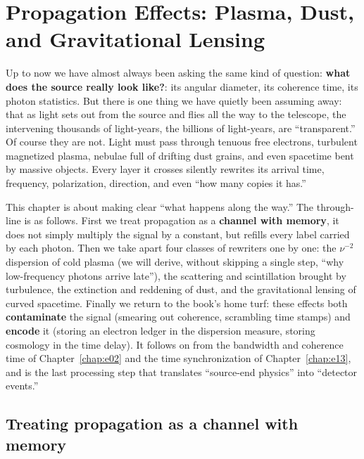 \chapter{Propagation Effects: Plasma, Dust, and Gravitational Lensing}
\label{chap:e21}

\begin{chapteropening}
Up to now we have almost always been asking the same kind of question: \textbf{what does the source really look like?}: its angular diameter, its coherence time, its photon statistics. But there is one thing we have quietly been assuming away: that as light sets out from the source and flies all the way to the telescope, the intervening thousands of light-years, the billions of light-years, are ``transparent.'' Of course they are not. Light must pass through tenuous free electrons, turbulent magnetized plasma, nebulae full of drifting dust grains, and even spacetime bent by massive objects. Every layer it crosses silently rewrites its arrival time, frequency, polarization, direction, and even ``how many copies it has.''

This chapter is about making clear ``what happens along the way.'' The through-line is as follows. First we treat propagation as a \textbf{channel with memory}, it does not simply multiply the signal by a constant, but refills every label carried by each photon. Then we take apart four classes of rewriters one by one: the \(\nu^{-2}\) dispersion of cold plasma (we will derive, without skipping a single step, ``why low-frequency photons arrive late''), the scattering and scintillation brought by turbulence, the extinction and reddening of dust, and the gravitational lensing of curved spacetime. Finally we return to the book's home turf: these effects both \textbf{contaminate} the signal (smearing out coherence, scrambling time stamps) and \textbf{encode} it (storing an electron ledger in the dispersion measure, storing cosmology in the time delay). It follows on from the bandwidth and coherence time of Chapter~\ref{chap:e02} and the time synchronization of Chapter~\ref{chap:e13}, and is the last processing step that translates ``source-end physics'' into ``detector events.''
\end{chapteropening}

\section{Treating propagation as a channel with memory}
\label{sec:e21-channel}

